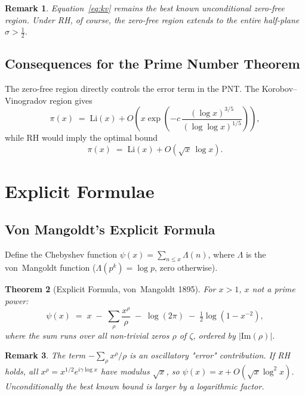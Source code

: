 \documentclass[12pt,a4paper]{article}
\newtheorem{theorem}{Theorem}[section]
\newtheorem{remark}[theorem]{Remark}
\theoremstyle{remark}
\begin{document}
\begin{remark}
  Equation~\eqref{eq:kv} remains the best known unconditional zero-free region.
  Under RH, of course, the zero-free region extends to the entire half-plane $\sigma > \tfrac{1}{2}$.
\end{remark}

\subsection{Consequences for the Prime Number Theorem}

The zero-free region directly controls the error term in the PNT.  The Korobov--Vinogradov
region gives
\[
  \pi(x) \;=\; \mathrm{Li}(x) + O\!\left(x\exp\!\left(-c\,\frac{(\log x)^{3/5}}{(\log\log x)^{1/5}}\right)\right),
\]
while RH would imply the optimal bound
\[
  \pi(x) \;=\; \mathrm{Li}(x) + O\!\left(\sqrt{x}\,\log x\right).
\]

\section{Explicit Formulae}

\subsection{Von Mangoldt's Explicit Formula}

Define the Chebyshev function $\psi(x) = \sum_{n\leq x}\Lambda(n)$, where $\Lambda$ is
the von~Mangoldt function ($\Lambda(p^k)=\log p$, zero otherwise).

\begin{theorem}[Explicit Formula, von~Mangoldt 1895]
  For $x > 1$, $x$ not a prime power:
  \begin{equation}\label{eq:explicit}
    \psi(x) \;=\; x \;-\; \sum_{\rho}\frac{x^{\rho}}{\rho} \;-\; \log(2\pi)
              \;-\; \tfrac{1}{2}\log\!\left(1 - x^{-2}\right),
  \end{equation}
  where the sum runs over all non-trivial zeros $\rho$ of $\zeta$, ordered by $|\mathrm{Im}(\rho)|$.
\end{theorem}

\begin{remark}
  The term $-\sum_\rho x^\rho/\rho$ is an oscillatory "error" contribution.  If RH holds,
  all $x^\rho = x^{1/2} e^{i\gamma\log x}$ have modulus $\sqrt{x}$, so
  $\psi(x) = x + O(\sqrt{x}\log^2 x)$.  Unconditionally the best known bound is
  larger by a logarithmic factor.
\end{remark}
\end{document}
